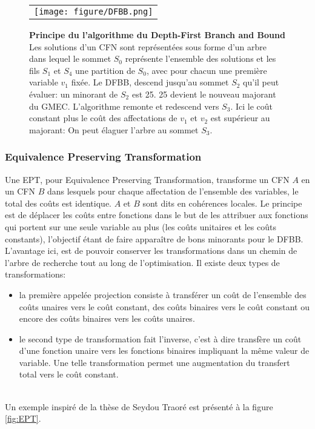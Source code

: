 \begin{figure}[!htbp]
  \centering
  \begin{tabular}{c}
    \texttt{[image: figure/DFBB.png]} \\
  \end{tabular}
  \caption{\textbf{Principe du l'algorithme du Depth-First Branch and Bound} Les solutions d'un CFN sont représentées sous forme d'un arbre dans lequel le sommet $S_0$ représente l'ensemble des solutions et les fils $S_1$ et $S_4$ une partition de $S_0$, avec pour chacun une première variable $v_1$ fixée. Le DFBB, descend jusqu'au sommet $S_2$ qu'il peut évaluer: un minorant de $S_2$ est 25. 25 devient le nouveau majorant du GMEC. L'algorithme remonte et redescend vers $S_3$. Ici le coût constant plus le coût des affectations de $v_1$ et $v_2$ est supérieur au majorant: On peut élaguer l'arbre au sommet $S_3$.}
  \label{fig:DFBB}
\end{figure}

\subsubsection{Equivalence Preserving Transformation}
Une EPT, pour \og Equivalence Preserving Transformation\fg, transforme un CFN $A$ en un CFN $B$ dans lesquels pour chaque affectation de l'ensemble des variables, le total des coûts  est identique. $A$ et $B$ sont dits en cohérences locales. Le principe est de déplacer les coûts entre fonctions dans le but de les attribuer aux fonctions qui portent sur une seule variable au plus (les coûts unitaires et les coûts constants), l'objectif étant de faire apparaître de bons minorants \cite{schiex00} pour le DFBB. L'avantage ici, est de pouvoir conserver les transformations dans un chemin de l'arbre de recherche tout au long de l'optimisation. Il existe deux types de transformations:
\begin{itemize}
\item la première appelée projection consiste à transférer un coût de l'ensemble des coûts unaires vers le coût constant, des coûts binaires vers le coût constant ou encore des coûts binaires vers les coûts unaires.
\item le second type de transformation fait l'inverse, c'est à dire transfère un coût d'une fonction unaire vers les fonctions binaires impliquant la même valeur de variable. Une telle transformation permet une augmentation du transfert total vers le coût constant.
\end{itemize}\\
Un exemple inspiré de la thèse de Seydou Traoré est présenté à  la figure \ref{fig:EPT}.

